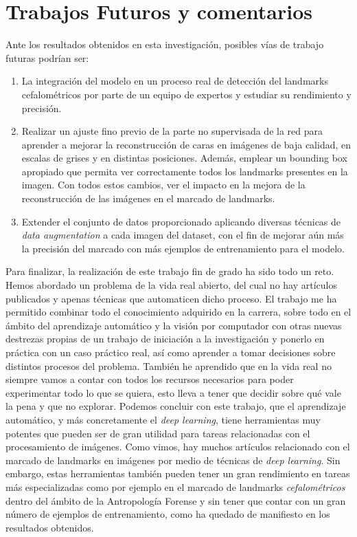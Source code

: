 \section{Trabajos Futuros y comentarios}

\noindent Ante los resultados obtenidos en esta investigación, posibles vías de trabajo futuras podrían ser:

\begin{enumerate}
    \item La integración del modelo en un proceso real de detección del landmarks cefalométricos por parte de un equipo de expertos y estudiar su rendimiento y precisión.
    \item Realizar un ajuste fino previo de la parte no supervisada de la red para aprender a mejorar la reconstrucción de caras en imágenes de baja calidad, en escalas de grises y en distintas posiciones. Además, emplear un bounding box apropiado que permita ver correctamente todos los landmarks presentes en la imagen. Con todos estos cambios, ver el impacto en la mejora de la reconstrucción de las imágenes en el marcado de landmarks.
    \item Extender el conjunto de datos proporcionado aplicando diversas técnicas de \textit{data augmentation} a cada imagen del dataset, con el fin de mejorar aún más la precisión del marcado con más ejemplos de entrenamiento para el modelo.
\end{enumerate}

\medskip

\noindent Para finalizar, la realización de este trabajo fin de grado ha sido todo un reto. Hemos abordado un problema de la vida real abierto, del cual no hay artículos publicados y apenas técnicas que automaticen dicho proceso. El trabajo me ha permitido combinar todo el conocimiento adquirido en la carrera, sobre todo en el ámbito del aprendizaje automático y la visión por computador con otras nuevas destrezas propias de un trabajo de iniciación a la investigación y ponerlo en práctica con un caso práctico real, así como aprender a tomar decisiones sobre distintos procesos del problema. También he aprendido que en la vida real no siempre vamos a contar con todos los recursos necesarios para poder experimentar todo lo que se quiera, esto lleva a tener que decidir sobre qué vale la pena y que no explorar. Podemos concluir con este trabajo, que el aprendizaje automático, y más concretamente el \textit{deep learning}, tiene herramientas muy potentes que pueden ser de gran utilidad para tareas relacionadas con el procesamiento de imágenes. Como vimos, hay muchos artículos relacionado con el marcado de landmarks en imágenes por medio de técnicas de \textit{deep learning}. Sin embargo, estas herramientas también pueden tener un gran rendimiento en tareas más especializadas como por ejemplo en el marcado de landmarks \textit{cefalométricos} dentro del ámbito de la Antropología Forense y sin tener que contar con un gran número de ejemplos de entrenamiento, como ha quedado de manifiesto en los resultados obtenidos.


\endinput

